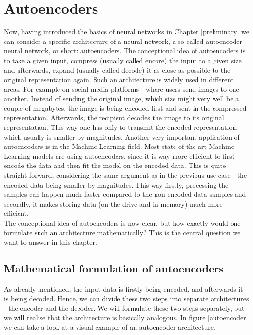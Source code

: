 \justifying
\chapter{Autoencoders}

Now, having introduced the basics of neural networks in Chapter \ref{preliminary} we can consider a specific architecture of a neural network, a so called autoencoder neural network, or short: autoencoders. The conceptional idea of autoencoders is to take a given input, compress (usually called encore) the input to a given size and afterwards, expand (usually called decode) it as close as possible to the original representation again. Such an architecture is widely used in different areas. For example on social media platforms - where users send images to one another. Instead of sending the original image, which size might very well be a couple of megabytes, the image is being encoded first and sent in the compressed representation. Afterwards, the recipient decodes the image to its original representation. This way one has only to transmit the encoded representation, which usually is smaller by magnitudes.
Another very important application of autoencoders is in the Machine Learning field. Most state of the art Machine Learning models are using autoencoders, since it is way more efficient to first encode the data and then fit the model on the encoded data. This is quite straight-forward, considering the same argument as in the previous use-case - the encoded data being smaller by magnitudes. This way firstly, processing the samples can happen much faster compared to the non-encoded data samples and secondly, it makes storing data (on the drive and in memory) much more efficient.\\
The conceptional idea of autoencoders is now clear, but how exactly would one formulate such an architecture mathematically? This is the central question we want to answer in this chapter.

\section{Mathematical formulation of autoencoders}

As already mentioned, the input data is firstly being encoded, and afterwards it is being decoded. Hence, we can divide these two steps into separate architectures - the encoder and the decoder. We will formulate these two steps separately, but we will realise that the architecture is basically analogous. In figure \ref{autoencoder} we can take a look at a visual example of an autoencoder architecture.


